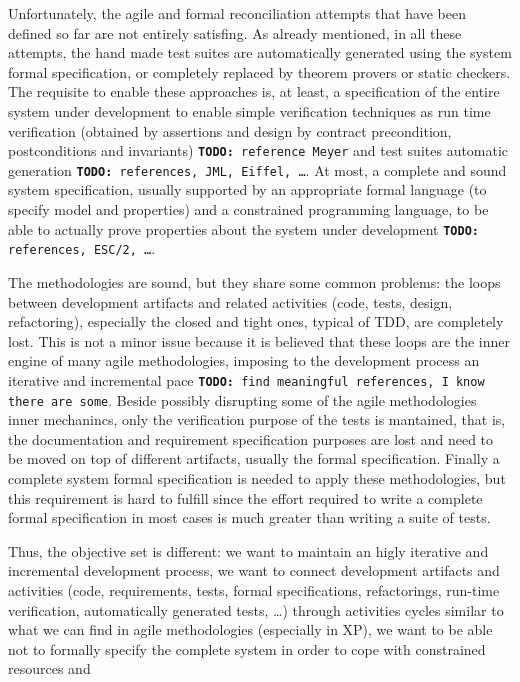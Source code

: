 \documentclass{article} \usepackage{times}
\newcommand{\todo}[1]{\texttt{\textbf{TODO:} #1}}
\begin{document}
Unfortunately, the agile and formal reconciliation attempts that have been defined so far are not entirely satisfing.
As already mentioned, in all these attempts, the hand made test suites are automatically generated using the system formal specification, or completely replaced by theorem provers or static checkers. 
The requisite to enable these approaches is, at least, a specification of the entire system under development to enable simple verification techniques as run time verification (obtained by assertions and design by contract precondition, postconditions and invariants) \todo{reference Meyer} and test suites automatic generation \todo{references, JML, Eiffel, \ldots}.
At most, a complete and sound system specification, usually supported by an appropriate formal language (to specify model and properties) and a constrained programming language, to be able to actually prove properties about the system under development \todo{references, ESC/2, \ldots}.

The methodologies are sound, but they share some common problems: the loops between development artifacts and related activities (code, tests, design, refactoring), especially the closed and tight ones, typical of TDD, are completely lost. 
This is not a minor issue because it is believed that these loops are the inner engine of many agile methodologies, imposing to the development process an iterative and incremental pace \todo{find meaningful references, I know there are some}.
Beside possibly disrupting some of the agile methodologies inner mechanincs, only the verification purpose of the tests is mantained, that is, the documentation and requirement specification purposes are lost and need to be moved on top of different artifacts, usually the formal specification.
Finally a complete system formal specification is needed to apply these methodologies, but this requirement is hard to fulfill since the effort required to write a complete formal specification in most cases is much greater than writing a suite of tests.

Thus, the objective set is different: we want to maintain an higly iterative and incremental development process, we want to connect development artifacts and activities (code, requirements, tests, formal specifications, refactorings, run-time verification, automatically generated tests, \ldots) through activities cycles similar to what we can find in agile methodologies (especially in XP), we want to be able not to formally specify the complete system in order to cope with constrained resources and 
\end{document}
